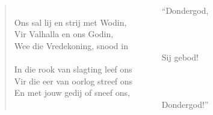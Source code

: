 \begin{verse}
\ \ \ \ \ \ \ \ \ \ \ \ \ \ \ \ \ \ \ \ \ \ \ \ \ \ \ \ \ \ \ \ \ \ \ ``Dondergod, \\ 
Ons sal lij en strij met Wodin, \\ 
Vir Valhalla en ons Godin, \\ 
Wee die Vredekoning, snood in \\ 
\ \ \ \ \ \ \ \ \ \ \ \ \ \ \ \ \ \ \ \ \ \ \ \ \ \ \ \ \ \ \ \ \ \ \ Sij gebod! \\ 
In die rook van slagting leef ons \\ 
Vir die eer van oorlog streef ons \\ 
En met jouw gedij of sneef ons, \\ 
\ \ \ \ \ \ \ \ \ \ \ \ \ \ \ \ \ \ \ \ \ \ \ \ \ \ \ \ \ \ \ \ \ \ \ Dondergod!'' \\ 
\end{verse}